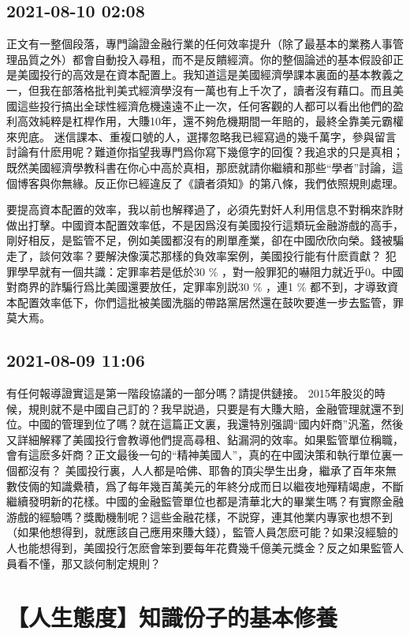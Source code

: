 \documentclass[twocolumn]{ctexart}
\begin{document}
\subsection*{2021-08-10 02:08}

正文有一整個段落，專門論證金融行業的任何效率提升（除了最基本的業務人事管理品質之外）都會自動投入尋租，而不是反饋經濟。你的整個論述的基本假設卻正是美國投行的高效是在資本配置上。我知道這是美國經濟學課本裏面的基本教義之一，但我在部落格批判美式經濟學沒有一萬也有上千次了，讀者沒有藉口。而且美國這些投行搞出全球性經濟危機遠遠不止一次，任何客觀的人都可以看出他們的盈利高效純粹是杠桿作用，大賺10年，還不夠危機期間一年賠的，最終全靠美元霸權來兜底。
迷信課本、重複口號的人，選擇忽略我已經寫過的幾千萬字，參與留言討論有什麽用呢？難道你指望我專門爲你寫下幾億字的回復？我追求的只是真相；既然美國經濟學教科書在你心中高於真相，那麽就請你繼續和那些“學者”討論，這個博客與你無緣。反正你已經違反了《讀者須知》的第八條，我們依照規則處理。

要提高資本配置的效率，我以前也解釋過了，必須先對奸人利用信息不對稱來詐財做出打擊。中國資本配置效率低，不是因爲沒有美國投行這類玩金融游戲的高手，剛好相反，是監管不足，例如美國都沒有的刷單產業，卻在中國欣欣向榮。錢被騙走了，談何效率？要解決像漢芯那樣的負效率案例，美國投行能有什麽貢獻？
犯罪學早就有一個共識：定罪率若是低於30 \% ，對一般罪犯的嚇阻力就近乎0。中國對商界的詐騙行爲比美國還要放任，定罪率別説30 \% ，連1 \% 都不到，才導致資本配置效率低下，你們這批被美國洗腦的帶路黨居然還在鼓吹要進一步去監管，罪莫大焉。
\subsection*{2021-08-09 11:06}

有任何報導證實這是第一階段協議的一部分嗎？請提供鏈接。
2015年股災的時候，規則就不是中國自己訂的？我早説過，只要是有大賺大賠，金融管理就還不到位。中國的管理到位了嗎？就在這篇正文裏，我還特別强調“國内奸商”汎濫，然後又詳細解釋了美國投行會教導他們提高尋租、鉆漏洞的效率。如果監管單位稱職，會有這麽多奸商？正文最後一句的“精神美國人”，真的在中國決策和執行單位裏一個都沒有？
美國投行裏，人人都是哈佛、耶魯的頂尖學生出身，繼承了百年來無數伎倆的知識纍積，爲了每年幾百萬美元的年終分成而日以繼夜地殫精竭慮，不斷繼續發明新的花樣。中國的金融監管單位也都是清華北大的畢業生嗎？有實際金融游戲的經驗嗎？獎勵機制呢？這些金融花樣，不説穿，連其他業内專家也想不到（如果他想得到，就應該自己應用來賺大錢），監管人員怎麽可能？如果沒經驗的人也能想得到，美國投行怎麽會笨到要每年花費幾千億美元獎金？反之如果監管人員看不懂，那又談何制定規則？
\section*{【人生態度】知識份子的基本修養}
\end{document}
